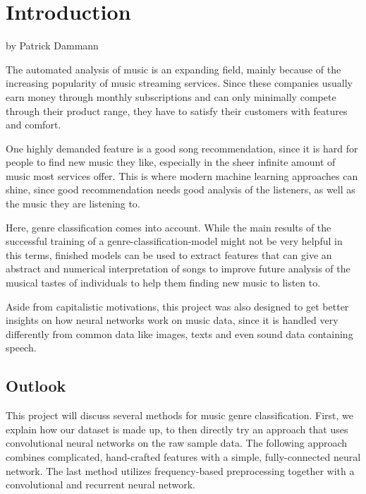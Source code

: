 \chapter{Introduction}
by Patrick Dammann

\bigskip

The automated analysis of music is an expanding field, mainly because of the increasing popularity of music streaming services. Since these companies usually earn money through monthly subscriptions and can only minimally compete through their product range, they have to satisfy their customers with features and comfort.

One highly demanded feature is a good song recommendation, since it is hard for people to find new music they like, especially in the sheer infinite amount of music most services offer. This is where modern machine learning approaches can shine, since good recommendation needs good analysis of the listeners, as well as the music they are listening to.

Here, genre classification comes into account. While the main results of the successful training of a genre-classification-model might not be very helpful in this terms, finished models can be used to extract features that can give an abstract and numerical interpretation of songs to improve future analysis of the musical tastes of individuals to help them finding new music to listen to.

Aside from capitalistic motivations, this project was also designed to get better insights on how neural networks work on music data, since it is handled very differently from common data like images, texts and even sound data containing speech.

\section{Outlook}

This project will discuss several methods for music genre classification. First, we explain how our dataset is made up, to then directly try an approach that uses convolutional neural networks on the raw sample data. The following approach combines complicated, hand-crafted features with a simple, fully-connected neural network. The last method utilizes frequency-based preprocessing together with a convolutional and recurrent neural network.